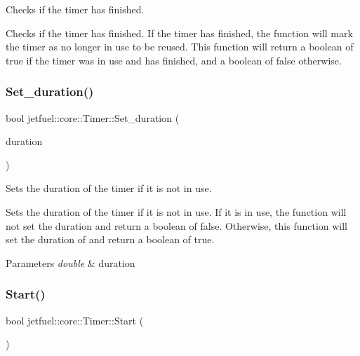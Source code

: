 Checks if the timer has finished. 

Checks if the timer has finished. If the timer has finished, the function will mark the timer as no longer in use to be reused. This function will return a boolean of true if the timer was in use and has finished, and a boolean of false otherwise. \mbox{\label{classjetfuel_1_1core_1_1Timer_ae2ab6506258494eb67eed42b04931cde}} 
\subsubsection{\texorpdfstring{Set\+\_\+duration()}{Set\_duration()}}
{\footnotesize\ttfamily bool jetfuel\+::core\+::\+Timer\+::\+Set\+\_\+duration (\begin{DoxyParamCaption}\item[{double}]{duration }\end{DoxyParamCaption})\hspace{0.3cm}{\ttfamily [inline]}}



Sets the duration of the timer if it is not in use. 

Sets the duration of the timer if it is not in use. If it is in use, the function will not set the duration and return a boolean of false. Otherwise, this function will set the duration of and return a boolean of true.


\begin{DoxyParams}{Parameters}
{\em double} & duration \\
\hline
\end{DoxyParams}
\mbox{\label{classjetfuel_1_1core_1_1Timer_a4f41614b70ab87a40ecd5ce55f2fc224}} 
\subsubsection{\texorpdfstring{Start()}{Start()}}
{\footnotesize\ttfamily bool jetfuel\+::core\+::\+Timer\+::\+Start (\begin{DoxyParamCaption}{ }\end{DoxyParamCaption})\hspace{0.3cm}{\ttfamily [inline]}}



